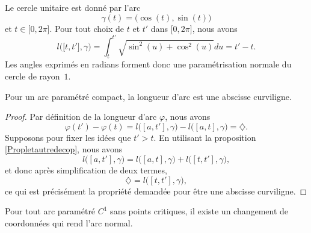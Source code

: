 \begin{example}     \label{ExCerlceRadNorm}
Le cercle unitaire est donné par l'arc
\begin{equation}
    \gamma(t)=\big( \cos(t),\sin(t) \big)
\end{equation}
et $t\in\mathopen[ 0 , 2\pi \mathclose]$. Pour tout choix de $t$ et $t'$ dans $\mathopen[ 0 , 2\pi \mathclose]$, nous avons
\begin{equation}
    l\big( \mathopen[ t , t' \mathclose],\gamma \big)=\int_t^{t'}\sqrt{\sin^2(u)+\cos^2(u)}du=t'-t.
\end{equation}
Les angles exprimés en radians forment donc une paramétrisation normale du cercle de rayon~$1$.
\end{example}

\begin{lemma}
Pour un arc paramétré compact, la longueur d'arc est une abscisse curviligne.
\end{lemma}

\begin{proof}
Par définition de la longueur d'arc $\varphi$, nous avons
\begin{equation}
    \varphi(t')-\varphi(t)=l\big( [a,t'],\gamma \big)-l\big( [a,t],\gamma \big)=\diamondsuit.
\end{equation}
Supposons pour fixer les idées que $t'>t$. En utilisant la proposition \ref{Propletautredecop}, nous avons
\begin{equation}
    l\big( [a,t'],\gamma \big)=l\big( [a,t],\gamma \big)+l\big( [t,t'],\gamma \big),
\end{equation}
et donc après simplification de deux termes,
\begin{equation}
    \diamondsuit=l\big( [t,t'],\gamma \big),
\end{equation}
ce qui est précisément la propriété demandée pour être une abscisse curviligne.
\end{proof}

\begin{proposition}     \label{PropExisteChmNorm}
Pour tout arc paramétré $C^1$ sans points critiques, il existe un changement de coordonnées qui rend l'arc normal.
\end{proposition}

